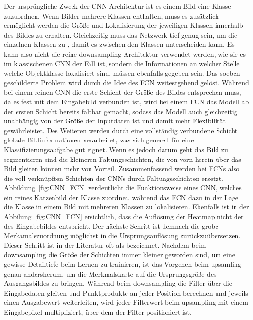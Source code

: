 Der ursprüngliche Zweck der \ac{CNN}-Architektur ist es einem Bild eine Klasse zuzuordnen.
Wenn Bilder mehrere Klassen enthalten, muss es zusätzlich ermöglicht werden die Größe und Lokalisierung der jeweiligen
Klassen innerhalb des Bildes zu erhalten.
Gleichzeitig muss das Netzwerk tief genug sein, um die einzelnen Klassen zu \grqq, damit es zwischen den
Klassen unterscheiden kann.
Es kann also nicht die reine downsampling Architektur verwendet werden, wie sie es im klassischenen \ac{CNN} der Fall ist,
sondern die Informationen an welcher Stelle welche Objektklasse lokalisiert sind, müssen ebenfalls gegeben sein.
Das soeben geschilderte Problem wird durch die Idee des \ac{FCN} weitestgehend gelöst.
Während bei einem reinen \ac{CNN} die erste Schicht der Größe des Bildes entsprechen muss, da es fest mit dem
Eingabebild verbunden ist, wird bei einem \ac{FCN} das Modell ab der ersten Schicht bereits faltbar gemacht, sodass das
Modell auch gleichzeitig unabhängig von der Größe der Inputdaten ist und damit mehr Flexibilität gewährleistet.
Des Weiteren werden durch eine vollständig verbundene Schicht globale Bildinformationen verarbeitet, was sich generell
für eine Klassifizierungsaufgabe gut eignet.
Wenn es jedoch darum geht das Bild zu segmentieren sind die kleineren Faltungsschichten, die von vorn herein über das
Bild gleiten können mehr von Vorteil.
Zusammenfassend werden bei \ac{FCN}s also die voll verknüpften Schichten der \ac{CNN}s durch Faltungsschichten ersetzt.
Abbildung~\ref{fig:CNN_FCN} verdeutlicht die Funktionsweise eines \ac{CNN}, welches ein reines Katzenbild der Klasse
\grqq zuordnet, während das \ac{FCN} dazu in der Lage die Klasse \grqq in einem Bild mit mehreren
Klassen zu lokalisieren.
Ebenfalls ist in der Abbilung~\ref{fig:CNN_FCN} ersichtlich, dass die Auflösung der Heatmap nicht der des Eingabebildes
entspricht.
Der nächste Schritt ist demnach die grobe Merkamalszuordnung möglichst in die Ursprungsauflösung zurückzuübersetzen.
Dieser Schritt ist in der Literatur oft als \grqq bezeichnet.
Nachdem beim downsampling die Größe der Schichten immer kleiner geworden sind, um eine gewisse Detailtiefe beim Lernen
zu trainieren, ist das Vorgehen beim upsamling genau andersherum, um die Merkmalskarte auf die Ursprungsgröße des
Ausgangsbildes zu bringen.
Während beim downsampling die Filter über die Eingabedaten gleiten und Punktprodukte an jeder Position berechnen und
jeweils einen Ausgabewert weiterleiten, wird jeder Filterwert beim upsampling mit einem Eingabepixel multipliziert, über
dem der Filter positioniert ist.
